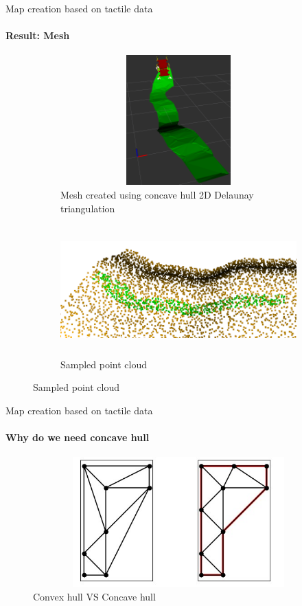 \documentclass[aspectratio=169]{beamer}
\begin{document}
\begin{frame}[t]{Map creation based on tactile data}
    \framesubtitle{Result: Mesh}
    \vspace{-15pt}
    \begin{figure}[H]
        \begin{subfigure}{0.49\textwidth}
            \centering\includegraphics[height=5cm,width=1\textwidth,keepaspectratio]{mesh_rviz.png}
            \caption*{Mesh created using concave hull 2D Delaunay triangulation}
        \end{subfigure}
        \begin{subfigure}{0.49\textwidth}
            \centering\includegraphics[height=5cm,width=1\textwidth,keepaspectratio]{sampled_pcd.png}
            \caption*{Sampled point cloud}
        \end{subfigure}
    \end{figure}
\end{frame}


\begin{frame}[t]{Map creation based on tactile data}
    \framesubtitle{Why do we need concave hull}
    \vspace{-15pt}
    \begin{figure}[H]
        \centering\includegraphics[height=5cm,width=1\textwidth,keepaspectratio]{concave_expl.png}
        \caption{Convex hull VS Concave hull}
        \label{fig:concave_expl.png}
    \end{figure}
\end{frame}
\end{document}
